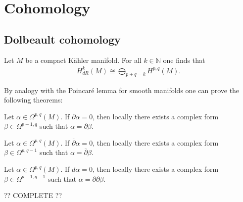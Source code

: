 \section{Cohomology}
%

\subsection{Dolbeault cohomology}

    \begin{theorem}
        Let $M$ be a compact K\"ahler manifold. For all $k\in\mathbb{N}$ one finds that
        \begin{gather}
            H^k_{dR}(M) \cong \bigoplus_{p+q=k}H^{p, q}(M).
        \end{gather}
    \end{theorem}

    By analogy with the Poincar\'e lemma for smooth manifolds one can prove the following theorems:
    \begin{theorem}
        Let $\alpha\in\Omega^{p, q}(M)$. If $\partial\alpha = 0$, then locally there exists a complex form $\beta\in\Omega^{p-1, q}$ such that $\alpha = \partial\beta$.
    \end{theorem}
    \begin{theorem}
        Let $\alpha\in\Omega^{p, q}(M)$. If $\overline{\partial}\alpha = 0$, then locally there exists a complex form $\beta\in\Omega^{p, q-1}$ such that $\alpha = \overline{\partial}\beta$.
    \end{theorem}
    \begin{theorem}\label{complex:del_delbar_lemma}
        Let $\alpha\in\Omega^{p, q}(M)$. If $d\alpha = 0$, then locally there exists a complex form $\beta\in\Omega^{p-1, q-1}$ such that $\alpha = \partial\overline{\partial}\beta$.
    \end{theorem}

    ?? COMPLETE ??